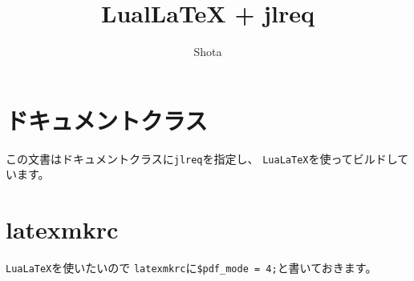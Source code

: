 \documentclass{jlreq}
\title{LualLaTeX + jlreq}
\author{Shota}
\begin{document}
\tableofcontents

\section{ドキュメントクラス}

この文書はドキュメントクラスに\texttt{jlreq}を指定し、
\texttt{LuaLaTeX}を使ってビルドしています。

\section{latexmkrc}

\texttt{LuaLaTeX}を使いたいので
\texttt{latexmkrc}に\texttt{\$pdf\_mode = 4;}と書いておきます。





\end{document}
